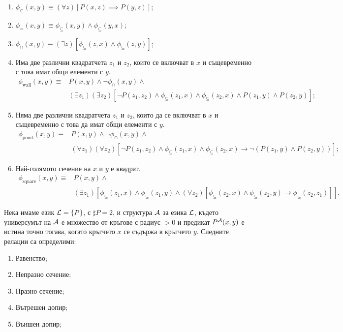 \begin{solution}
  \begin{enumerate}[1)]
  \item
    $\phi_{\subseteq}(x,y) \equiv (\forall z)[P(x,z) \implies P(y,z)]$;
  \item
    $\phi_{=}(x,y) \equiv \phi_{\subseteq}(x,y) \land \phi_{\subseteq}(y,x)$;
  \item
    $\phi_{\cap}(x,y) \equiv (\exists z)[\phi_{\subseteq}(z,x) \land \phi_{\subseteq}(z,y)]$;
  \item
    Има две различни квадратчета $z_1$ и $z_2$, които се включват в $x$ и същевременно с това имат общи елементи с $y$.
    \begin{align*}
      \phi_{\text{wall}}(x,y) \equiv &  P(x,y) \land \neg \phi_{\cap}(x,y) \land\\
                                 & (\exists z_1)(\exists z_2)[\neg P(z_1,z_2) \land \phi_{\subseteq}(z_1,x) \land \phi_{\subseteq}(z_2,x) \land P(z_1,y)\land P(z_2,y)];
    \end{align*}
  \item
    Няма две различни квадратчета $z_1$ и $z_2$, които да се включват в $x$ и същевременно с това да имат общи елементи с $y$.
    \begin{align*}
      \phi_{\text{point}}(x,y) \equiv &  P(x,y) \land \neg \phi_{\cap}(x,y) \land\\
                                      & (\forall z_1)(\forall z_2)[\neg P(z_1,z_2) \land \phi_{\subseteq}(z_1,x) \land \phi_{\subseteq}(z_2,x) \to \neg(P(z_1,y)\land P(z_2,y))];
    \end{align*}
  \item
    Най-голямото сечение на $x$ и $y$ е квадрат.
    \begin{align*}
      \phi_{\text{square}}(x,y) \equiv & P(x,y) \land \\
                                       & (\exists z_1)[\phi_{\subseteq}(z_1,x) \land \phi_{\subseteq}(z_1,y) \land (\forall z_2)[\phi_{\subseteq}(z_2,x) \land \phi_{\subseteq}(z_2,y) \to \phi_{\subseteq}(z_2,z_1)]].
    \end{align*}
  \end{enumerate}
\end{solution}

\begin{problem}
  Нека имаме език $\mathcal{L} = \{P\}$, с $\sharp P = 2$, и структура $\mathcal{A}$ за езика $\mathcal{L}$, където
  универсумът на $\mathcal{A}$ е множество от кръгове с радиус $> 0$ и предикат $P^{\mathcal{A}}(x,y)$ е истина точно тогава, когато кръгчето $x$ се съдържа в кръгчето $y$.
  Следните релации са определими:
  \begin{enumerate}[1)]
  \item
    Равенство;
  \item
    Непразно сечение;
  \item
    Празно сечение;
  \item
    Вътрешен допир;
  \item
    Външен допир;
  \end{enumerate}
\end{problem}

